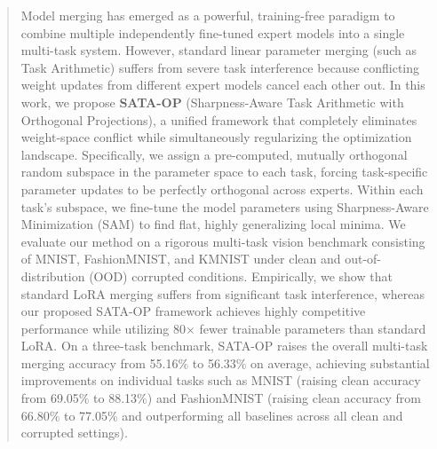 \documentclass{article}
\theoremstyle{plain}
\theoremstyle{definition}
\theoremstyle{remark}
\begin{document}

\printAffiliationsAndNotice{}

\begin{abstract}
  Model merging has emerged as a powerful, training-free paradigm to combine multiple independently fine-tuned expert models into a single multi-task system. However, standard linear parameter merging (such as Task Arithmetic) suffers from severe task interference because conflicting weight updates from different expert models cancel each other out. In this work, we propose \textbf{SATA-OP} (Sharpness-Aware Task Arithmetic with Orthogonal Projections), a unified framework that completely eliminates weight-space conflict while simultaneously regularizing the optimization landscape. Specifically, we assign a pre-computed, mutually orthogonal random subspace in the parameter space to each task, forcing task-specific parameter updates to be perfectly orthogonal across experts. Within each task's subspace, we fine-tune the model parameters using Sharpness-Aware Minimization (SAM) to find flat, highly generalizing local minima. We evaluate our method on a rigorous multi-task vision benchmark consisting of MNIST, FashionMNIST, and KMNIST under clean and out-of-distribution (OOD) corrupted conditions. Empirically, we show that standard LoRA merging suffers from significant task interference, whereas our proposed SATA-OP framework achieves highly competitive performance while utilizing 80$\times$ fewer trainable parameters than standard LoRA. On a three-task benchmark, SATA-OP raises the overall multi-task merging accuracy from 55.16\% to 56.33\% on average, achieving substantial improvements on individual tasks such as MNIST (raising clean accuracy from 69.05\% to 88.13\%) and FashionMNIST (raising clean accuracy from 66.80\% to 77.05\% and outperforming all baselines across all clean and corrupted settings).
\end{abstract}
\end{document}
